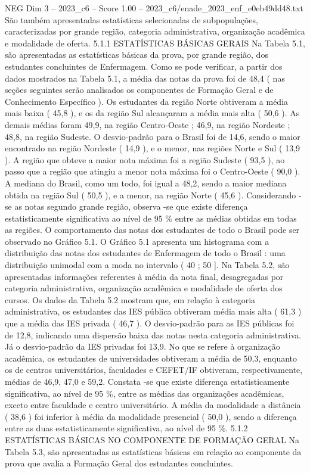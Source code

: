 \begin{textsample}{NEG Dim 3 – 2023\_c6 – Score 1.00 – 2023\_c6/enade\_2023\_enf\_e0eb49dd48.txt}
São também apresentadas estatísticas selecionadas de subpopulações, caracterizadas por grande região, categoria administrativa, organização acadêmica e modalidade de oferta. 5.1.1 ESTATÍSTICAS BÁSICAS GERAIS Na Tabela 5.1, são apresentadas as estatísticas básicas da prova, por grande região, dos estudantes concluintes de Enfermagem.
Como se pode verificar, a partir dos dados mostrados na Tabela 5.1, a média das notas da prova foi de 48,4 ( nas seções seguintes serão analisados os componentes de Formação Geral e de Conhecimento Específico ).
Os estudantes da região Norte obtiveram a média mais baixa ( 45,8 ), e os da região Sul alcançaram a média mais alta ( 50,6 ).
As demais médias foram 49,9, na região Centro-Oeste ; 46,9, na região Nordeste ; 48,8, na região Sudeste.
O desvio-padrão para o Brasil foi de 14,6, sendo o maior encontrado na região Nordeste ( 14,9 ), e o menor, nas regiões Norte e Sul ( 13,9 ).
A região que obteve a maior nota máxima foi a região Sudeste ( 93,5 ), ao passo que a região que atingiu a menor nota máxima foi o Centro-Oeste ( 90,0 ).
A mediana do Brasil, como um todo, foi igual a 48,2, sendo a maior mediana obtida na região Sul ( 50,5 ), e a menor, na região Norte ( 45,6 ).
Considerando -se as notas segundo grande região, observa -se que existe diferença estatisticamente significativa ao nível de 95 \% entre as médias obtidas em todas as regiões.
O comportamento das notas dos estudantes de todo o Brasil pode ser observado no Gráfico 5.1.
O Gráfico 5.1 apresenta um histograma com a distribuição das notas dos estudantes de Enfermagem de todo o Brasil : uma distribuição unimodal com a moda no intervalo ( 40 ; 50 ].
Na Tabela 5.2, são apresentadas informações referentes à média da nota final, desagregadas por categoria administrativa, organização acadêmica e modalidade de oferta dos cursos.
Os dados da Tabela 5.2 mostram que, em relação à categoria administrativa, os estudantes das IES pública obtiveram média mais alta ( 61,3 ) que a média das IES privada ( 46,7 ).
O desvio-padrão para as IES públicas foi de 12,8, indicando uma dispersão baixa das notas nesta categoria administrativa.
Já o desvio-padrão da IES privadas foi 13,9.
No que se refere à organização acadêmica, os estudantes de universidades obtiveram a média de 50,3, enquanto os de centros universitários, faculdades e CEFET/IF obtiveram, respectivamente, médias de 46,9, 47,0 e 59,2.
Constata -se que existe diferença estatisticamente significativa, ao nível de 95 \%, entre as médias das organizações acadêmicas, exceto entre faculdade e centro universitário.
A média da modalidade a distância ( 38,6 ) foi inferior à média da modalidade presencial ( 50,0 ), sendo a diferença entre as duas estatisticamente significativa, ao nível de 95 \%. 5.1.2 ESTATÍSTICAS BÁSICAS NO COMPONENTE DE FORMAÇÃO GERAL Na Tabela 5.3, são apresentadas as estatísticas básicas em relação ao componente da prova que avalia a Formação Geral dos estudantes concluintes.

\end{textsample}
